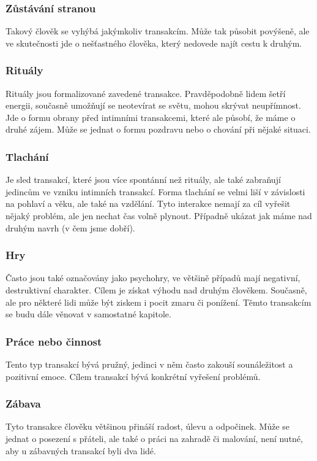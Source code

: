 \subsubsection*{Zůstávání stranou}
Takový člověk se vyhýbá jakýmkoliv transakcím. Může tak působit povýšeně, ale ve skutečnosti jde o nešťastného člověka, který nedovede najít cestu k druhým.

\subsubsection*{Rituály}
Rituály jsou formalizované zavedené transakce. 
Pravděpodobně lidem šetří energii, současně umožňují se neotevírat se světu, mohou skrývat neupřímnost. 
Jde o formu obrany před intimními transakcemi, které ale působí, že máme o druhé zájem. 
Může se jednat o formu pozdravu nebo o chování při nějaké situaci.

\subsubsection*{Tlachání}
Je sled transakcí, které jsou více spontánní než rituály, ale také zabraňují jedincům ve vzniku intimních transakcí. Forma tlachání se velmi liší v závislosti na pohlaví a věku, ale také na vzdělání. Tyto interakce nemají za cíl vyřešit nějaký problém, ale jen nechat čas volně plynout. Případně ukázat jak máme nad druhým navrh (v čem jsme dobří). 

\subsubsection*{Hry}
Často jsou také označovány jako psychohry, ve většině případů mají negativní, destruktivní charakter. Cílem je získat výhodu nad druhým člověkem. Současně, ale pro některé lidi může být ziskem i pocit zmaru či ponížení. Těmto transakcím se budu dále věnovat v samostatné kapitole.

\subsubsection*{Práce nebo činnost}
Tento typ transakcí bývá pružný, jedinci v něm často zakouší sounáležitost a pozitivní emoce. Cílem transakcí bývá konkrétní vyřešení problémů.

\subsubsection*{Zábava}
Tyto transakce člověku většinou přináší radost, úlevu a odpočinek.
Může se jednat o posezení s přáteli, ale také o práci na zahradě či malování, není nutné, aby u zábavných transakcí byli dva lidé.


